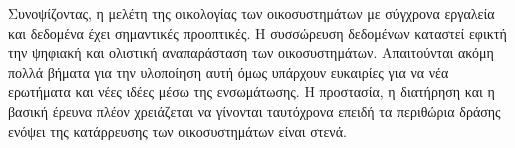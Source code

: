 \documentclass[11pt]{article}
\begin{document}
Συνοψίζοντας, η μελέτη της οικολογίας των οικοσυστημάτων με σύγχρονα εργαλεία και δεδομένα
έχει σημαντικές προοπτικές. Η συσσώρευση δεδομένων καταστεί εφικτή την
ψηφιακή και ολιστική αναπαράσταση των οικοσυστημάτων. Απαιτούνται ακόμη πολλά βήματα
για την υλοποίηση αυτή όμως υπάρχουν ευκαιρίες για να νέα ερωτήματα και νέες ιδέες
μέσω της ενσωμάτωσης. Η προστασία, η διατήρηση και η βασική έρευνα πλέον χρειάζεται να 
γίνονται ταυτόχρονα επειδή τα περιθώρια δράσης ενόψει της κατάρρευσης των
οικοσυστημάτων είναι στενά.
\end{document}
